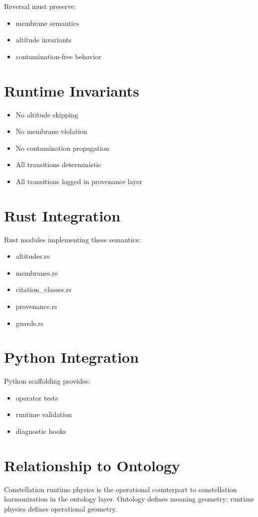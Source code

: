 \documentclass[12pt]{article}
\begin{document}
Reversal must preserve:
\begin{itemize}
  \item membrane semantics
  \item altitude invariants
  \item contamination-free behavior
\end{itemize}

\section{Runtime Invariants}

\begin{itemize}
  \item No altitude skipping
  \item No membrane violation
  \item No contamination propagation
  \item All transitions deterministic
  \item All transitions logged in provenance layer
\end{itemize}

\section{Rust Integration}

Rust modules implementing these semantics:
\begin{itemize}
  \item altitudes.rs
  \item membranes.rs
  \item citation\_classes.rs
  \item provenance.rs
  \item guards.rs
\end{itemize}

\section{Python Integration}

Python scaffolding provides:
\begin{itemize}
  \item operator tests
  \item runtime validation
  \item diagnostic hooks
\end{itemize}

\section{Relationship to Ontology}

Constellation runtime physics is the operational counterpart to constellation
harmonization in the ontology layer. Ontology defines meaning geometry; runtime
physics defines operational geometry.
\end{document}
